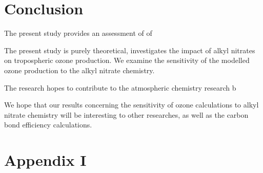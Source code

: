 \documentclass[11pt,a4paper]{article}
\begin{document}
\section{Conclusion} \label{sec:conclusion}
The present study provides an assessment of of

The present study is purely theoretical, investigates the impact of alkyl nitrates on tropospheric ozone production.
We examine the sensitivity of the modelled ozone production to the alkyl nitrate chemistry.

The research hopes to contribute to the atmospheric chemistry research b

We hope that our results concerning the sensitivity of ozone calculations to alkyl nitrate chemistry will be interesting to other researches, as well as the carbon bond efficiency calculations.



\section{Appendix I} \label{sec:appendix1}
\end{document}
